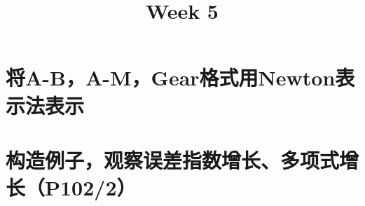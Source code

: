 \documentclass{homework}
\title{Week 5}
\date{}
\begin{document}
\maketitle
\section{将A-B，A-M，Gear格式用Newton表示法表示}

\section{构造例子，观察误差指数增长、多项式增长（P102/2）}
\end{document}
